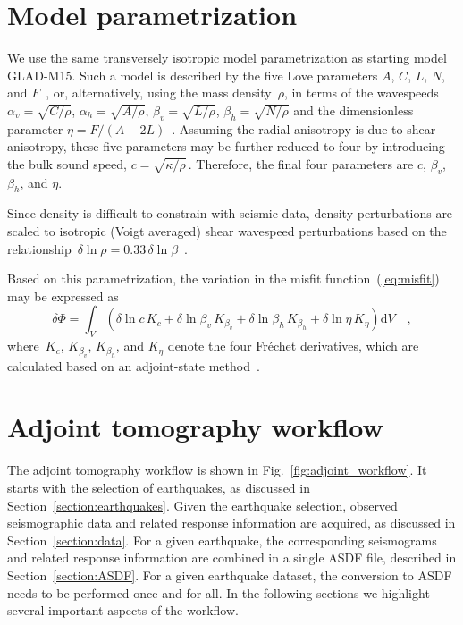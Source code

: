 \documentclass[extra,mreferee]{gji}
\begin{document}
\section{Model parametrization}

We use the same transversely isotropic model parametrization as starting model GLAD-M15.
Such a model is described by the five Love parameters $A$, $C$, $L$, $N$, and $F$~\citep{Love27},
or, alternatively, using the mass density~$\rho$, in terms of the wavespeeds~$\alpha_v=\sqrt{C/\rho}$, $\alpha_h=\sqrt{A/\rho}$, $\beta_v=\sqrt{L/\rho}$, $\beta_h=\sqrt{N/\rho}$ and the dimensionless parameter $\eta=F/(A-2L)$~\citep{PREM,DT98}.
Assuming the radial anisotropy is due to shear anisotropy, these five parameters
may be further reduced to four by introducing the bulk sound speed,
$c=\sqrt{\kappa/\rho}$\,.
Therefore, the final four parameters are $c$, $\beta_v$, $\beta_h$, and $\eta$.

Since density is difficult to constrain with seismic data,
density perturbations are scaled to isotropic (Voigt averaged) shear wavespeed perturbations based on the relationship~$\delta\ln\rho = 0.33\,\delta\ln\beta$~\citep{montagner1989petrological}.

Based on this parametrization,
the variation in the misfit function~(\ref{eq:misfit}) may be expressed as~\citep{zhu2015seismic,bozdaug2016global}
\begin{equation}
    \delta \Phi = \int_V
      (\delta \ln c\,K_c + \delta \ln\beta_v\,K_{\beta_v} + \delta \ln\beta_h\,K_{\beta_h} +
      \delta\ln\eta\,K_\eta) \mathrm{d}V
      \quad ,
\end{equation}
where~$K_c$, $K_{\beta_v}$, $K_{\beta_h}$, and $K_\eta$ denote the four Fr\'echet derivatives,
which are calculated based on an adjoint-state method~\citep[e.g.,][]{Plessix_2006_RAS,Tromp2005}.

\section{Adjoint tomography workflow}

The adjoint tomography workflow is shown in Fig.~\ref{fig:adjoint_workflow}.
It starts with the selection of earthquakes, as discussed in Section~\ref{section:earthquakes}.
Given the earthquake selection,
observed seismographic data and related response information are acquired,
as discussed in Section~\ref{section:data}.
For a given earthquake,
the corresponding seismograms and related response information are combined in a single ASDF file,
described in Section~\ref{section:ASDF}.
For a given earthquake dataset, the conversion to ASDF needs to be performed once and for all.
In the following sections we highlight several important aspects of the workflow.
\end{document}
